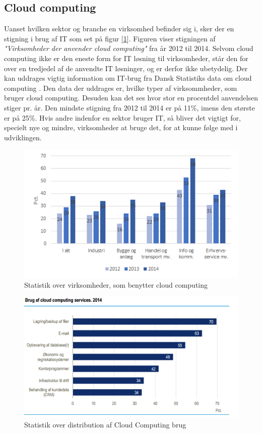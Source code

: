 \subsection{Cloud computing}
Uanset hvilken sektor og branche en virksomhed befinder sig i, sker der en stigning i brug af IT som set på figur [\ref{fig:virksomcc}]. Figuren viser stigningen af \textit{"Virksomheder der anvender cloud computing"} fra år 2012 til 2014. Selvom cloud computing ikke er den eneste form for IT løsning til virksomheder, står den for over en tredjedel af de anvendte IT løsninger, og er derfor ikke ubetydelig. Der kan uddrages vigtig information om IT-brug fra Dansk Statistiks data om cloud computing \citep{itvirk}. Den data der uddrages er, hvilke typer af virksommheder, som bruger cloud computing. Desuden kan det ses hvor stor en procentdel anvendelsen stiger pr. år. Den mindste stigning fra 2012 til 2014 er på 11\%, imens den største er på 25\%. Hvis andre indenfor en sektor bruger IT, så bliver det vigtigt for, specielt nye og mindre, virksomheder  at bruge det, for at kunne følge med i udviklingen.  
\newpage
\begin{figure}[H]
    \centering
    \includegraphics[width=1\textwidth]{figures/CloudComputingStatestik.png}
    \caption{Statistik over virksomheder, som benytter cloud computing \citep{itvirk}} 
    \label{fig:virksomcc}
\end{figure}

\begin{figure}[H]
    \centering
    \includegraphics[width=1\textwidth]{figures/brugafccservices.png}
    \caption{Statistik over distribution af Cloud Computing brug \citep{itvirk}}
    \label{fig:distcc}
\end{figure}

